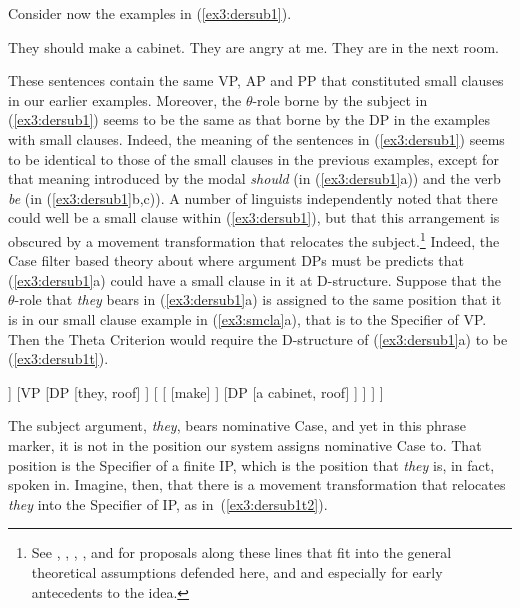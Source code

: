 Consider now the examples in (\ref{ex3:dersub1}).
\begin{exe}
\ex \label{ex3:dersub1} 
\begin{xlist}
	\ex They should make a cabinet.
	\ex They are angry at me.
	\ex They are in the next room.
\end{xlist}
\end{exe}
These sentences contain the same VP, AP and PP that constituted small clauses in our earlier examples. Moreover, the \mbox{$\theta$-role} borne by the subject in (\ref{ex3:dersub1}) seems to be the same as that borne by the DP in the examples with small clauses. Indeed, the meaning of the sentences in (\ref{ex3:dersub1}) seems to be identical to those of the small clauses in the previous examples, except for that meaning introduced by the modal \emph{should} (in (\ref{ex3:dersub1}a)) and the verb \emph{be} (in (\ref{ex3:dersub1}b,c)). A number of linguists independently noted that there could well be a small clause within (\ref{ex3:dersub1}), but that this arrangement is obscured by a movement transformation that relocates the subject.\footnote{See \citet{Kuroda:1988}, \citet{Kitagawa:1986}, \citet{Fukui:1986a}, \citet{Bowers:1993}, and \citet{Koopman:1991} for proposals along these lines that fit into the general theoretical assumptions defended here, and \citet{Fillmore:1968} and especially \citet{McCawley:1968a} for early antecedents to the idea.} Indeed, the Case filter based theory about where argument DPs must be predicts that (\ref{ex3:dersub1}a) could have a small clause in it at D-structure. Suppose that the \mbox{$\theta$-role} that \emph{they} bears in (\ref{ex3:dersub1}a) is assigned to the same position that it is in our small clause example in (\ref{ex3:smcla}a), that is to the Specifier of VP. Then the Theta Criterion would require the D-structure of (\ref{ex3:dersub1}a) to be (\ref{ex3:dersub1t}).
\begin{exe}
\ex \label{ex3:dersub1t} 
\small
\begin{forest}
[\ibar{I}
	[\obar{I} [should] ]
	[VP
		[DP [they, roof] ]
		[
			[ [make] ]
			[DP [a cabinet, roof] ]
		 ]
	 ]
]
\end{forest}
\end{exe}
The subject argument, \emph{they}, bears nominative Case, and yet in this phrase marker, it is not in the position our system assigns nominative Case to. That position is the Specifier of a finite IP, which is the position that \emph{they} is, in fact, spoken in. Imagine, then, that there is a movement transformation that relocates \emph{they} into the Specifier of IP, as in~(\ref{ex3:dersub1t2}).
